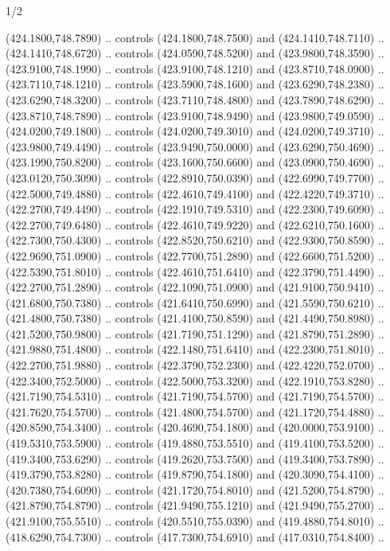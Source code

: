 \begin{flagdescription}{1/2}
\begin{scope}[xshift=0.5\flaglength]
\begin{scope}[scale=0.00745\flagwidth,xshift=-12.1mm,yshift=41.7mm]
\begin{scope}[y=0.80pt, x=0.80pt, yscale=-1, xscale=1, inner sep=0pt, outer sep=0pt]
\begin{scope}[cm={{1.33333,0.0,0.0,-1.33333,(0.0,114.66667)}}]
\begin{scope}[scale=0.100]
  (424.1800,748.7890) .. controls (424.1800,748.7500) and (424.1410,748.7110) ..
  (424.1410,748.6720) .. controls (424.0590,748.5200) and (423.9800,748.3590) ..
  (423.9100,748.1990) .. controls (423.9100,748.1210) and (423.8710,748.0900) ..
  (423.7110,748.1210) .. controls (423.5900,748.1600) and (423.6290,748.2380) ..
  (423.6290,748.3200) .. controls (423.7110,748.4800) and (423.7890,748.6290) ..
  (423.8710,748.7890) .. controls (423.9100,748.9490) and (423.9800,749.0590) ..
  (424.0200,749.1800) .. controls (424.0200,749.3010) and (424.0200,749.3710) ..
  (423.9800,749.4490) .. controls (423.9490,750.0000) and (423.6290,750.4690) ..
  (423.1990,750.8200) .. controls (423.1600,750.6600) and (423.0900,750.4690) ..
  (423.0120,750.3090) .. controls (422.8910,750.0390) and (422.6990,749.7700) ..
  (422.5000,749.4880) .. controls (422.4610,749.4100) and (422.4220,749.3710) ..
  (422.2700,749.4490) .. controls (422.1910,749.5310) and (422.2300,749.6090) ..
  (422.2700,749.6480) .. controls (422.4610,749.9220) and (422.6210,750.1600) ..
  (422.7300,750.4300) .. controls (422.8520,750.6210) and (422.9300,750.8590) ..
  (422.9690,751.0900) .. controls (422.7700,751.2890) and (422.6600,751.5200) ..
  (422.5390,751.8010) .. controls (422.4610,751.6410) and (422.3790,751.4490) ..
  (422.2700,751.2890) .. controls (422.1090,751.0900) and (421.9100,750.9410) ..
  (421.6800,750.7380) .. controls (421.6410,750.6990) and (421.5590,750.6210) ..
  (421.4800,750.7380) .. controls (421.4100,750.8590) and (421.4490,750.8980) ..
  (421.5200,750.9800) .. controls (421.7190,751.1290) and (421.8790,751.2890) ..
  (421.9880,751.4800) .. controls (422.1480,751.6410) and (422.2300,751.8010) ..
  (422.2700,751.9880) .. controls (422.3790,752.2300) and (422.4220,752.0700) ..
  (422.3400,752.5000) .. controls (422.5000,753.3200) and (422.1910,753.8280) ..
  (421.7190,754.5310) .. controls (421.7190,754.5700) and (421.7190,754.5700) ..
  (421.7620,754.5700) .. controls (421.4800,754.5700) and (421.1720,754.4880) ..
  (420.8590,754.3400) .. controls (420.4690,754.1800) and (420.0000,753.9100) ..
  (419.5310,753.5900) .. controls (419.4880,753.5510) and (419.4100,753.5200) ..
  (419.3400,753.6290) .. controls (419.2620,753.7500) and (419.3400,753.7890) ..
  (419.3790,753.8280) .. controls (419.8790,754.1800) and (420.3090,754.4100) ..
  (420.7380,754.6090) .. controls (421.1720,754.8010) and (421.5200,754.8790) ..
  (421.8790,754.8790) .. controls (421.9490,755.1210) and (421.9490,755.2700) ..
  (421.9100,755.5510) .. controls (420.5510,755.0390) and (419.4880,754.8010) ..
  (418.6290,754.7300) .. controls (417.7300,754.6910) and (417.0310,754.8400) ..

\end{scope}
\end{scope}
\end{scope}
\end{scope}
\end{scope}
\end{flagdescription}
